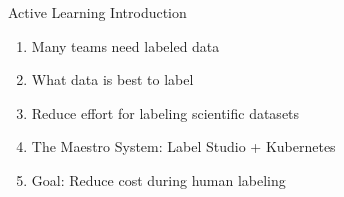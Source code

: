 






\begin{frame}{Active Learning Introduction}
    \begin{enumerate}
        \item Many teams need labeled data
        \item What data is best to label
        \item Reduce effort for labeling scientific datasets
        \item The Maestro System: Label Studio + Kubernetes
        \item Goal: Reduce cost during human labeling
    \end{enumerate}
\end{frame}

